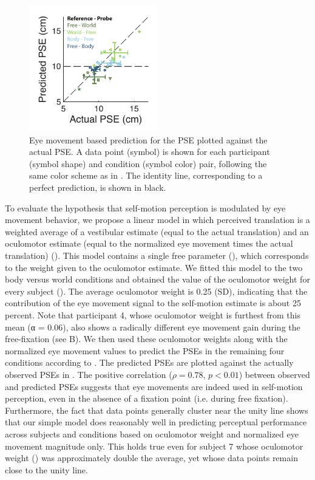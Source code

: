 \begin{figure}
    \includegraphics[width=0.5\textwidth]{src/paper3/figure4.pdf}

    \caption{Eye movement based prediction for the PSE plotted against the actual PSE.  A data point (symbol) is shown for each participant (symbol shape) and condition (symbol color) pair, following the same color scheme as in . The identity line, corresponding to a perfect prediction, is shown in black.}
    \label{p3:fig4}    
\end{figure}

To evaluate the hypothesis that self-motion perception is modulated by eye movement behavior, we propose a linear model in which perceived translation is a weighted average of a vestibular estimate (equal to the actual translation) and an oculomotor estimate (equal to the normalized eye movement times the actual translation) (). This model contains a single free parameter (), which corresponds to the weight given to the oculomotor estimate. We fitted this model to the two body versus world conditions and obtained the value of the oculomotor weight for every subject (). The average oculomotor weight is 0.25  (SD), indicating that the contribution of the eye movement signal to the self-motion estimate is about 25 percent. Note that participant 4, whose oculomotor weight is furthest from this mean (α = 0.06), also shows a radically different eye movement gain during the free-fixation (see B). We then used these oculomotor weights along with the normalized eye movement values to predict the PSEs in the remaining four conditions according to . The predicted PSEs are plotted against the actually observed PSEs in . The positive correlation ($\rho = 0.78$, $p < 0.01$) between observed and predicted PSEs suggests that eye movements are indeed used in self-motion perception, even in the absence of a fixation point (i.e. during free fixation). Furthermore, the fact that data points generally cluster near the unity line shows that our simple model does reasonably well in predicting perceptual performance across subjects and conditions based on oculomotor weight and normalized eye movement magnitude only. This holds true even for subject 7 whose oculomotor weight () was approximately double the average, yet whose data points remain close to the unity line.

